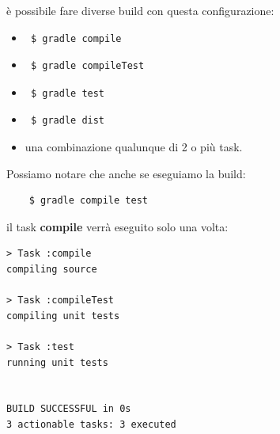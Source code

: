 è possibile fare diverse build con questa configurazione:
\begin{itemize}
    \item \begin{verbatim} $ gradle compile \end{verbatim}
    \item \begin{verbatim} $ gradle compileTest \end{verbatim}
    \item \begin{verbatim} $ gradle test \end{verbatim}
    \item \begin{verbatim} $ gradle dist \end{verbatim}
    \item una combinazione qualunque di 2 o più task.
\end{itemize}
Possiamo notare che anche se eseguiamo la build: 
\begin{verbatim}
    $ gradle compile test \end{verbatim}
il task \textbf{compile} verrà eseguito solo una volta:
\begin{verbatim}
> Task :compile 
compiling source

> Task :compileTest 
compiling unit tests

> Task :test 
running unit tests


BUILD SUCCESSFUL in 0s
3 actionable tasks: 3 executed \end{verbatim}

